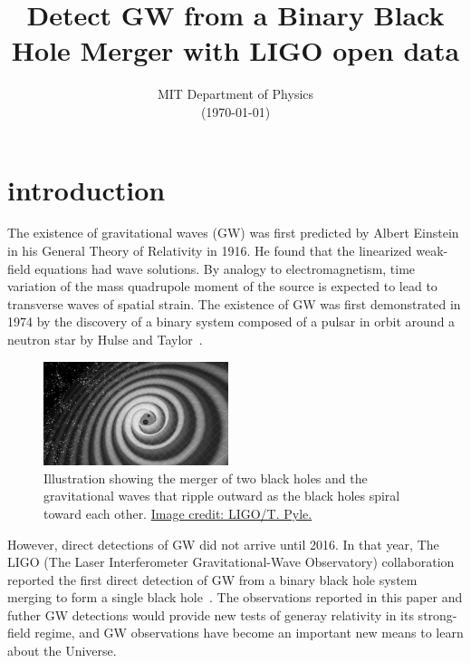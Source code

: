 \documentclass[twoside,twocolumn]{article}
\title{Detect GW from a Binary Black Hole Merger with LIGO open data} %
\author{\normalsize{MIT Department of Physics} \\
  \normalsize{(\today)}
}
\date{} %
\begin{document}
\maketitle


\section[Introduction]{introduction}\label{sec:intro}

The existence of gravitational waves (GW) was first predicted by Albert Einstein in his General Theory of Relativity in 1916.
He found that the linearized weak-field equations had wave solutions.
By analogy to electromagnetism, time variation of the mass quadrupole moment of the source is expected to lead to transverse waves of spatial strain.
The existence of GW was first demonstrated in 1974 by the discovery of a binary system composed of a pulsar in orbit around a neutron star by Hulse and Taylor~\cite{1975ApJ...195L..51H}.
\begin{figure}[hbpt]
  \begin{center}
    \includegraphics[width=0.48\textwidth]{figure/Gravity_Waves_StillImage_BW.png}
  \end{center}
  \caption{Illustration showing the merger of two black holes and the gravitational waves that ripple outward as the black holes spiral toward each other. \href{https://www.ligo.caltech.edu/image/ligo20160615f}{Image credit: LIGO/T. Pyle.}}
  \label{fig:intro.illustrate}
\end{figure}
However, direct detections of GW did not arrive until 2016.
In that year, The LIGO (The Laser Interferometer Gravitational-Wave Observatory) collaboration reported the first direct detection of GW from a binary black hole system merging to form a single black hole~\cite{PhysRevLett.116.061102}. 
The observations reported in this paper and futher GW detections would provide new tests of generay relativity in its strong-field regime, and GW observations have become an important new means to learn about the Universe.
\end{document}

